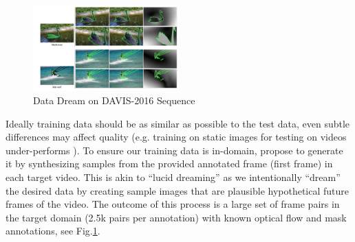 \begin{figure}[ht]
    \centering
    \includegraphics[width=0.5\textwidth]{./figure/data_dream.png}
    \caption{Data Dream on DAVIS-2016 Sequence}
    \label{data dream}
\end{figure}

Ideally training data should be as similar as possible to the test data, even subtle differences may affect quality (e.g. training on static images for testing on videos under-performs \cite{tang2012shifting}). To ensure our training data is in-domain, \cite{LucidTracker} propose to generate it by synthesizing samples from the provided annotated frame (first frame) in each target video. This is akin to “lucid dreaming” as we intentionally “dream” the desired data by creating sample images that are plausible hypothetical future frames of the video. The outcome of this process is a large set of frame pairs in the target domain (2.5k pairs per annotation) with known optical flow and mask annotations, see Fig.\ref{data dream}.

